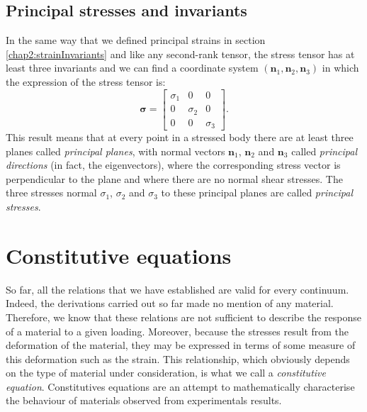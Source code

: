 	
		\subsection{Principal stresses and invariants}
In the same way that we defined principal strains in section \ref{chap2:strainInvariants} and like any second-rank tensor, the stress tensor has at least three invariants and we can find a coordinate system $(\mathbf{n}_1, \mathbf{n}_2, \mathbf{n}_3)$ in which the expression of the stress tensor is:
\begin{equation}
\boldsymbol \sigma =
	\begin{bmatrix}
	\sigma_1 &         0      &        0       \\
	        0      & \sigma_2 &        0       \\
	        0      &          0     & \sigma_3
	\end{bmatrix}	
	.
\end{equation}
This result means that at every point in a stressed body there are at least three planes called \emph{principal planes}, with normal vectors $\mathbf{n}_1$, $\mathbf{n}_2$ and $\mathbf{n}_3$ called \emph{principal directions} (in fact, the eigenvectors), where the corresponding stress vector is perpendicular to the plane and where there are no normal shear stresses. The three stresses normal $\sigma_1$, $\sigma_2$ and $\sigma_3$ to these principal planes are called \emph{principal stresses}.


\section{Constitutive equations}
So far, all the relations that we have established are valid for every continuum. Indeed, \ON the derivations carried out so far made no mention of any material. \OFF Therefore, \ON we know that \OFF these relations are not sufficient to describe the response of a material to a given loading. \ON Moreover, because the stresses result from the deformation of the material, they may be expressed \OFF in terms of some measure of this deformation such as the strain. This relationship, which obviously depends on the type of material under consideration, is what we call a \emph{constitutive equation}. \ON Constitutives equations are an attempt to mathematically characterise the behaviour of materials observed from experimentals results. \OFF

